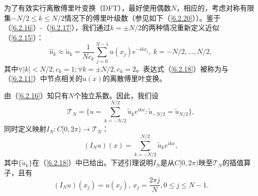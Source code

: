     为了有效实行离散傅里叶变换（DFT），最好使用偶数$N$，相应的，考虑对称有限集$-N/2\leq k\leq N/2$情况下的傅里叶级数（参见如下（\ref{6.2.20}））。鉴于（\ref{6.2.16}）-（\ref{6.2.17}），我们通过$k = \pm N/2$的两种情况重新定义近似（\ref{6.2.15}）：   
\begin{equation}
    \hat{u}_k \approx \widetilde{u}_k = \dfrac{1}{Nc_k} \sum_{j = 0}^{N-1} u(x_j)e^{-ikx_j}, \   k = -N/2,...,N/2,
\label{6.2.18}
\end{equation}    
    其中$\forall |k| < N/2, c_k = 1;\forall k = \pm N/2, c_k = 2$。表达式（\ref{6.2.18}）被称为与（\ref{6.2.11}）中节点相关的$u(x)$的离散傅里叶变换。
    
    由（\ref{6.2.16}）知只有$N$个独立系数。因此，我们设    
\begin{equation}
    \mathcal{T}_N = \{ u = \sum_{k = -N/2}^{N/2} \widetilde{u}_k e^{ikx} : \widetilde{u}_{-N/2} = \widetilde{u}_{N/2} \},
    \label{6.2.19}
\end{equation}        
    同时定义映射$I_N : C[0,2\pi) \rightarrow \mathcal{T}_N$：    
\begin{equation}
    (I_N u)(x) = \sum_{k = -N/2}^{N/2} \widetilde{u}_k e^{ikx},
    \label{6.2.20}
\end{equation}       
    其中$\{ \widetilde{u}_k \}$在（\ref{6.2.18}）中已给出。下述引理说明$I_N$是从$C[0,2\pi)$映至$\mathcal{T}_N$的插值算子，且有    
\begin{equation}
    (I_N u)(x_j) = u(x_j), \   x_j = \dfrac{2\pi j}{N}, 0\leq j\leq N-1.
    \label{6.2.21}
\end{equation}    

